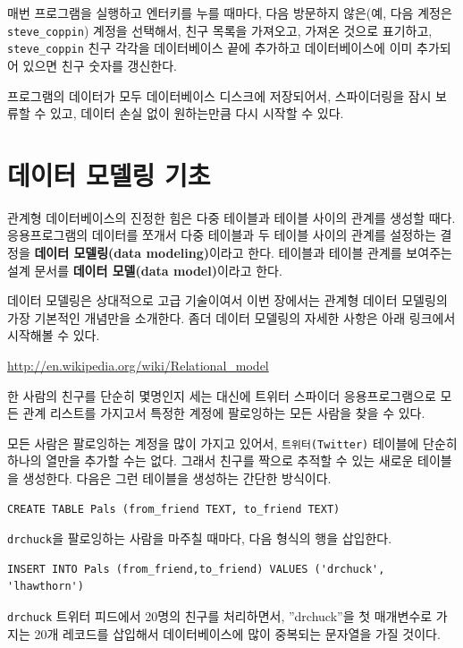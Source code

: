 매번 프로그램을 실행하고 엔터키를 누를 때마다, 다음 방문하지 않은(예, 다음 계정은 \verb"steve_coppin") 계정을
선택해서, 친구 목록을 가져오고, 가져온 것으로 표기하고, \verb"steve_coppin" 친구 각각을 데이터베이스 끝에
추가하고 데이터베이스에 이미 추가되어 있으면 친구 숫자를 갱신한다.

프로그램의 데이터가 모두 데이터베이스 디스크에 저장되어서, 스파이더링을 잠시 보류할 수 있고,
데이터 손실 없이 원하는만큼 다시 시작할 수 있다.

\section{데이터 모델링 기초}

관계형 데이터베이스의 진정한 힘은 다중 테이블과 테이블 사이의 관계를 생성할 때다.
응용프로그램의 데이터를 쪼개서 다중 테이블과 두 테이블 사이의 관계를 설정하는 결정을 
{\bf 데이터 모델링(data modeling)}이라고 한다. 테이블과 테이블 관계를 보여주는 설계 문서를 
{\bf 데이터 모델(data model)}이라고 한다.

데이터 모델링은 상대적으로 고급 기술이여서 이번 장에서는 관계형 데이터 모델링의 가장 기본적인 개념만을 소개한다.
좀더 데이터 모델링의 자세한 사항은 아래 링크에서 시작해볼 수 있다.

\url{http://en.wikipedia.org/wiki/Relational_model}

한 사람의 친구를 단순히 몇명인지 세는 대신에 트위터 스파이더 응용프로그램으로 모든 관계 리스트를 가지고서 특정한 계정에
팔로잉하는 모든 사람을 찾을 수 있다.

모든 사람은 팔로잉하는 계정을 많이 가지고 있어서, {\tt 트위터(Twitter)} 테이블에 단순히 하나의 열만을 추가할 수는 없다.
그래서 친구를 짝으로 추적할 수 있는 새로운 테이블을 생성한다. 다음은 그런 테이블을 생성하는 간단한 방식이다.

\beforeverb
\begin{verbatim}
CREATE TABLE Pals (from_friend TEXT, to_friend TEXT)
\end{verbatim}
\afterverb
%

{\tt drchuck}을 팔로잉하는 사람을 마주칠 때마다, 다음 형식의 행을 삽입한다.

\beforeverb
\begin{verbatim}
INSERT INTO Pals (from_friend,to_friend) VALUES ('drchuck', 'lhawthorn')
\end{verbatim}
\afterverb
%

{\tt drchuck} 트위터 피드에서 20명의 친구를 처리하면서, ''drchuck''을 첫 매개변수로 가지는 20개 레코드를 삽입해서
데이터베이스에 많이 중복되는 문자열을 가질 것이다.

